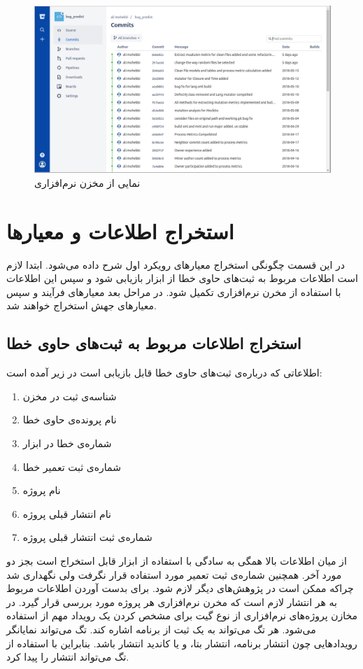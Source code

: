  \begin{figure}[H]
	\centering
	\includegraphics[width=1\textwidth]{img/case_study/bitbucket.png}
	\caption{نمایی از مخزن نرم‌افزاری}
	\label{fig:bitbucket}
\end{figure}



\section{استخراج اطلاعات و معیارها}
در این قسمت  چگونگی استخراج معیارهای رویکرد اول شرح داده می‌شود. ابتدا لازم است اطلاعات مربوط به ثبت‌های  حاوی خطا از ابزار  بازیابی شود و سپس این اطلاعات با استفاده از مخرن نرم‌افزاری تکمیل شود. در مراحل بعد معیار‌های فرآیند و سپس معیارهای جهش استخراج خواهند شد. 

\subsection{ استخراج اطلاعات مربوط به ثبت‌های   حاوی خطا}
اطلاعاتی که درباره‌ی ثبت‌های حاوی خطا قابل بازیابی است در زیر آمده است:
\begin{enumerate}
\item شناسه‌ی ثبت در مخزن 
\item نام پرونده‌ی حاوی خطا
\item شماره‌ی خطا در ابزار 
\item شماره‌ی ثبت تعمیر خطا
\item نام پروژه
\item نام انتشار قبلی پروژه
\item شماره‌ی ثبت انتشار قبلی پروژه
\end{enumerate}

از میان اطلاعات بالا همگی به سادگی با استفاده از ابزار  قابل استخراج است بجز دو مورد آخر. همچنین شماره‌ی ثبت تعمیر مورد استفاده قرار نگرفت ولی نگهداری شد چراکه ممکن است در پژوهش‌های دیگر لازم شود. 
برای بدست آوردن اطلاعات مربوط به هر انتشار لازم است که مخرن نرم‌افزاری هر پروژه مورد بررسی قرار گیرد. در  مخازن پروژه‌های نرم‌افزاری  از نوع گیت برای مشخص کردن یک رویداد مهم از  استفاده می‌شود. هر تگ می‌تواند به یک ثبت از برنامه اشاره کند. تگ می‌تواند نمایانگر رویدادهایی چون انتشار برنامه، انتشار بتا، و یا کاندید انتشار باشد. بنابراین با استفاده از تگ می‌تواند انتشار را پیدا کرد.\\

